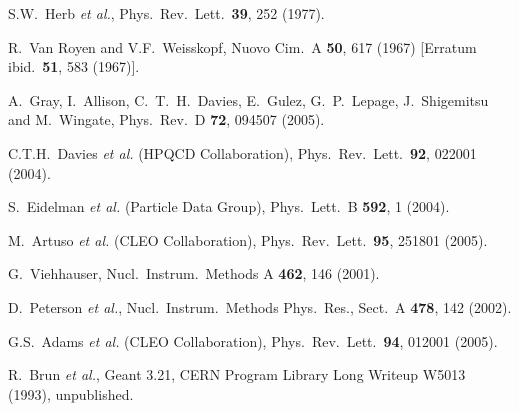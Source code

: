 \documentclass{cornell}
\begin{document}
\begin{thebibliography}{99}

S.W.~Herb {\it et al.},
Phys.\ Rev.\ Lett.\  {\bf 39}, 252 (1977).

R.~Van Royen and V.F.~Weisskopf,
Nuovo Cim.\ A {\bf 50}, 617 (1967)
[Erratum ibid.\ {\bf 51}, 583 (1967)].

A.~Gray, I.~Allison, C.~T.~H.~Davies, E.~Gulez, G.~P.~Lepage, J.~Shigemitsu and M.~Wingate,
Phys.\ Rev.\ D {\bf 72}, 094507 (2005).

C.T.H.~Davies {\it et al.}  (HPQCD Collaboration),
Phys.\ Rev.\ Lett.\  {\bf 92}, 022001 (2004).

S.~Eidelman {\it et al.}  (Particle Data Group),
Phys.\ Lett.\ B {\bf 592}, 1 (2004).

M.~Artuso {\it et al.}  (CLEO Collaboration),
Phys.\ Rev.\ Lett.\ {\bf 95}, 251801 (2005).

G.~Viehhauser, Nucl.\ Instrum.\ Methods A {\bf 462}, 146 (2001).

D.~Peterson {\it et al.}, Nucl.\ Instrum.\ Methods Phys.\ Res., Sect.\ A {\bf 478}, 142 (2002).

G.S.~Adams {\it et al.}  (CLEO Collaboration),
Phys.\ Rev.\ Lett.\  {\bf 94}, 012001 (2005).

R.~Brun {\it et al.}, {\textsc Geant} 3.21, CERN Program Library Long
Writeup W5013 (1993), unpublished.


\end{thebibliography}
\end{document}

